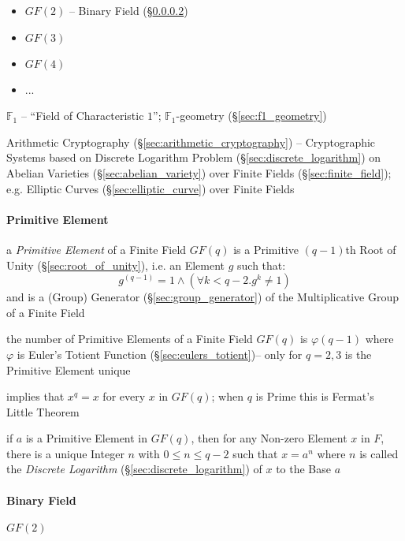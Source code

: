 \begin{itemize}
  \item $GF(2)$ -- Binary Field (\S\ref{sec:binary_field})
  \item $GF(3)$
  \item $GF(4)$
  \item ...
\end{itemize}

\fist $\mathbb{F}_1$ -- ``Field of Characteristic $1$''; $\mathbb{F}_1$-geometry
(\S\ref{sec:f1_geometry})

\fist Arithmetic Cryptography (\S\ref{sec:arithmetic_cryptography}) --
Cryptographic Systems based on Discrete Logarithm Problem
(\S\ref{sec:discrete_logarithm}) on Abelian Varieties
(\S\ref{sec:abelian_variety}) over Finite Fields (\S\ref{sec:finite_field});
e.g. Elliptic Curves (\S\ref{sec:elliptic_curve}) over Finite Fields



\paragraph{Primitive Element}\label{sec:primitive_element}\hfill

a \emph{Primitive Element} of a Finite Field $GF(q)$ is a Primitive $(q-1)$th
Root of Unity (\S\ref{sec:root_of_unity}), i.e. an Element $g$ such that:
\[
  g^(q-1) = 1 \wedge (\forall k < q-2. g^k \neq 1)
\]
and is a (Group) Generator (\S\ref{sec:group_generator}) of the Multiplicative
Group of a Finite Field

the number of Primitive Elements of a Finite Field $GF(q)$ is $\varphi(q - 1)$
where $\varphi$ is Euler's Totient Function (\S\ref{sec:eulers_totient})-- only
for $q=2,3$ is the Primitive Element unique

implies that $x^q = x$ for every $x$ in $GF(q)$; when $q$ is Prime this is
Fermat's Little Theorem

if $a$ is a Primitive Element in $GF(q)$, then for any Non-zero Element $x$ in
$F$, there is a unique Integer $n$ with $0 \leq n \leq q - 2$ such that
$x = a^n$ where $n$ is called the \emph{Discrete Logarithm}
(\S\ref{sec:discrete_logarithm}) of $x$ to the Base $a$



\paragraph{Binary Field}\label{sec:binary_field}\hfill

$GF(2)$

